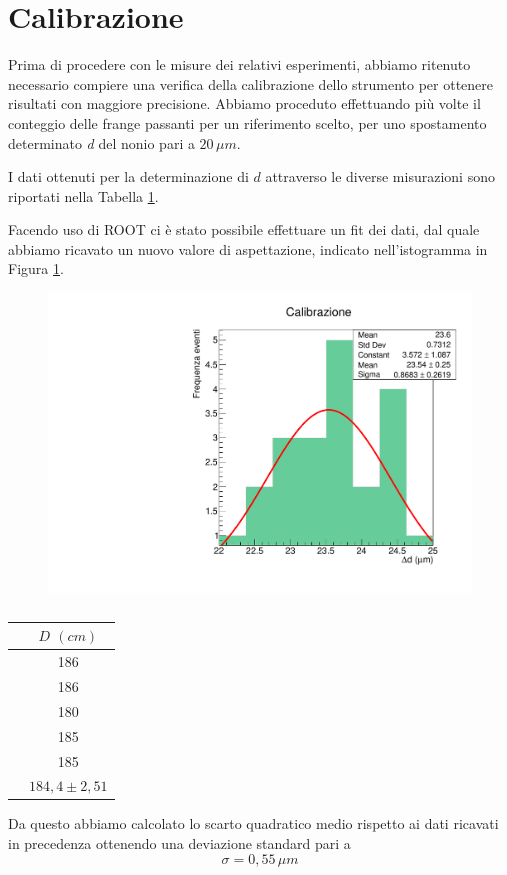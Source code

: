 \section{Calibrazione}
Prima di procedere con le misure dei relativi esperimenti, abbiamo ritenuto necessario compiere una verifica della calibrazione dello strumento per ottenere risultati con maggiore precisione.
Abbiamo proceduto effettuando più volte il conteggio delle frange passanti per un riferimento scelto, per uno spostamento determinato \textit{d} del nonio pari a $20\,\mu m$.

I dati ottenuti per la determinazione di $d$ attraverso le diverse misurazioni sono riportati nella Tabella \ref{tabella 1}.

Facendo uso di \textsc{ROOT} ci è stato possibile effettuare un fit dei dati, dal quale abbiamo ricavato un nuovo valore di aspettazione, indicato nell'istogramma in Figura \ref{figura 3}.
\begin{figure}[h!]
    \centering
    \includegraphics[scale=.35]{immagini/calibrazione nonnio.pdf}
    \caption{}
    \label{figura 3}
\end{figure}
\begin{table}[h!]
\centering
      \begin{tabular}{cc}
            & $D$ $(cm)$\\
    \hline
         & 186 \\
         & 186 \\
         & 180 \\
         & 185 \\
         & 185 \\
    \hline\hline
    & $184,4 \pm 2,51$
      \end{tabular}
      \caption{}
      \label{tabella 1}
 \end{table}

Da questo abbiamo calcolato lo scarto quadratico medio rispetto ai dati ricavati in precedenza ottenendo una deviazione standard pari a 
$$
\sigma = 0,55\, \mu m
$$

